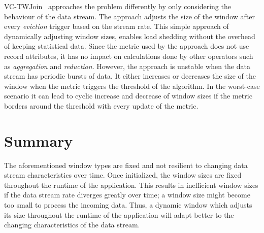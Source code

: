 VC-TWJoin~\cite{vctw_join} approaches the problem differently by only considering 
the behaviour of the data stream. The approach adjusts the size of the window 
after every \emph{eviction} trigger based on the stream rate. This simple approach 
of dynamically adjusting window sizes, enables load shedding without the overhead of 
keeping statistical data. Since the metric used by the approach does not use 
record attributes, it has no impact on calculations 
done by other operators such as \emph{aggregation} and \emph{reduction}.
However, the approach is unstable when the data stream has periodic bursts of data.
It either increases or decreases the size of the window when the metric triggers 
the threshold of the algorithm. In the worst-case scenario it can lead to cyclic increase and 
decrease of window sizes if the metric borders around the threshold with every 
update of the metric.


\section{Summary}%
\label{sec:Summary}

The aforementioned window types are fixed and not resilient to changing data stream characteristics over time. Once initialized, the window sizes 
are fixed throughout the runtime of the application. This results in inefficient 
window sizes if the data stream rate diverges greatly over time; a window size might become too small to process the incoming 
data. Thus, a dynamic window which adjusts its size throughout the runtime of the application 
will adapt better to the changing characteristics of the data stream. 



